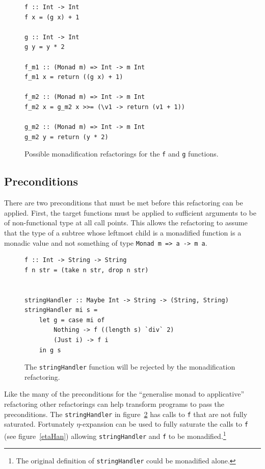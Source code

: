  

\begin{figure}[t]
\begin{lstlisting}
f :: Int -> Int
f x = (g x) + 1

g :: Int -> Int
g y = y * 2

f_m1 :: (Monad m) => Int -> m Int
f_m1 x = return ((g x) + 1)

f_m2 :: (Monad m) => Int -> m Int
f_m2 x = g_m2 x >>= (\v1 -> return (v1 + 1))

g_m2 :: (Monad m) => Int -> m Int
g_m2 y = return (y * 2)
\end{lstlisting}
\caption{Possible monadification refactorings for the \texttt{f} and \texttt{g} functions.}
\label{fgMon}
\end{figure} 

\subsection{Preconditions}

There are two preconditions that must be met before this refactoring can be applied. First, the target functions must be applied to sufficient arguments to be of non-functional type at all call points. This allows the refactoring to assume that the type of a subtree whose leftmost child is a monadified function is a monadic value and not something of type \texttt{Monad m => a -> m a}. 

\begin{figure}[t]
\begin{lstlisting}
f :: Int -> String -> String
f n str = (take n str, drop n str)


stringHandler :: Maybe Int -> String -> (String, String)
stringHandler mi s = 
	let g = case mi of
		Nothing -> f ((length s) `div` 2)
		(Just i) -> f i
	in g s
\end{lstlisting}
\caption{The \texttt{stringHandler} function will be rejected by the monadification refactoring.}
\label{strHan}
\end{figure}

Like the many of the preconditions for the ``generalise monad to applicative'' refactoring other refactorings can help transform programs to pass the preconditions. The \texttt{stringHandler} in figure~\ref{strHan} has calls to \texttt{f} that are not fully saturated. Fortunately $\eta$-expansion can be used to fully saturate the calls to \texttt{f} (see figure~\ref{etaHan}) allowing \texttt{stringHandler} and \texttt{f} to be monadified.\footnote{The original definition of \texttt{stringHandler} could be monadified alone.}

